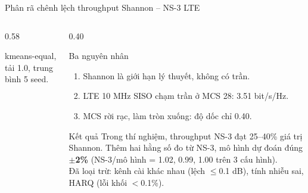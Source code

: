 \documentclass[aspectratio=169,10pt,t]{beamer}
\newcommand{\good}[1]{\textcolor{Good}{\textbf{#1}}}
\begin{document}
\begin{frame}{Phân rã chênh lệch throughput Shannon -- NS-3 LTE}
\begin{columns}[T,onlytextwidth]
\begin{column}{0.58\textwidth}
\vspace{0pt}
\centering
{}

{\scriptsize kmeans-equal, tải 1.0, trung bình 5 seed.}
\end{column}
\begin{column}{0.40\textwidth}
\vspace{0pt}
  \small
  \begin{block}{Ba nguyên nhân}
    \footnotesize
    \begin{enumerate}
      \item Shannon là giới hạn lý thuyết, không có trần.
      \item LTE 10 MHz SISO chạm trần ở MCS 28: 3.51 bit/s/Hz.
      \item MCS rời rạc, làm tròn xuống: độ dốc chỉ 0.40.
    \end{enumerate}
  \end{block}
  \begin{block}{Kết quả}
    \footnotesize Trong thí nghiệm, throughput NS-3 đạt \alert{25--40\%} giá trị Shannon. Thêm hai hằng số đo từ NS-3, mô hình dự đoán đúng \good{$\pm$2\%} (NS-3/mô hình = 1.02, 0.99, 1.00 trên 3 cấu hình).\\[1mm]
    Đã loại trừ: kênh cài khác nhau (lệch $\le$0.1 dB), tính nhiễu sai, HARQ (lỗi khối $<$0.1\%).
  \end{block}
\end{column}
\end{columns}
\end{frame}
\end{document}
